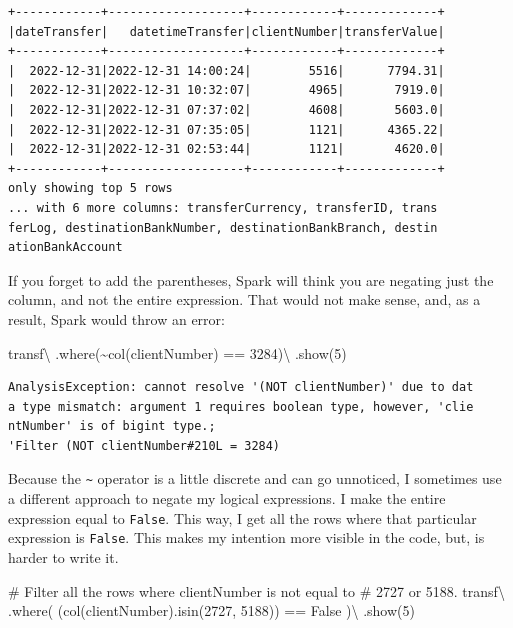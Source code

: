 \documentclass[
  11pt,
  letterpaper,
  DIV=11,
  numbers=noendperiod]{scrreprt}
\newenvironment{Shaded}{\begin{snugshade}}{\end{snugshade}}
\newcommand{\CommentTok}[1]{\textcolor[rgb]{0.37,0.37,0.37}{#1}}
\newcommand{\DecValTok}[1]{\textcolor[rgb]{0.68,0.00,0.00}{#1}}
\newcommand{\NormalTok}[1]{\textcolor[rgb]{0.00,0.23,0.31}{#1}}
\newcommand{\OperatorTok}[1]{\textcolor[rgb]{0.37,0.37,0.37}{#1}}
\newcommand{\StringTok}[1]{\textcolor[rgb]{0.13,0.47,0.30}{#1}}
\newcommand{\VariableTok}[1]{\textcolor[rgb]{0.07,0.07,0.07}{#1}}
\begin{document}
\begin{verbatim}
+------------+-------------------+------------+-------------+
|dateTransfer|   datetimeTransfer|clientNumber|transferValue|
+------------+-------------------+------------+-------------+
|  2022-12-31|2022-12-31 14:00:24|        5516|      7794.31|
|  2022-12-31|2022-12-31 10:32:07|        4965|       7919.0|
|  2022-12-31|2022-12-31 07:37:02|        4608|       5603.0|
|  2022-12-31|2022-12-31 07:35:05|        1121|      4365.22|
|  2022-12-31|2022-12-31 02:53:44|        1121|       4620.0|
+------------+-------------------+------------+-------------+
only showing top 5 rows
... with 6 more columns: transferCurrency, transferID, trans
ferLog, destinationBankNumber, destinationBankBranch, destin
ationBankAccount
\end{verbatim}

If you forget to add the parentheses, Spark will think you are negating
just the column, and not the entire expression. That would not make
sense, and, as a result, Spark would throw an error:

\begin{Shaded}
\begin{Highlighting}[]
\NormalTok{transf}\OperatorTok{\textbackslash{}}
\NormalTok{  .where(}\OperatorTok{\textasciitilde{}}\NormalTok{col(}\StringTok{\textquotesingle{}clientNumber\textquotesingle{}}\NormalTok{) }\OperatorTok{==} \DecValTok{3284}\NormalTok{)}\OperatorTok{\textbackslash{}}
\NormalTok{  .show(}\DecValTok{5}\NormalTok{)}
\end{Highlighting}
\end{Shaded}

\begin{verbatim}
AnalysisException: cannot resolve '(NOT clientNumber)' due to dat
a type mismatch: argument 1 requires boolean type, however, 'clie
ntNumber' is of bigint type.;
'Filter (NOT clientNumber#210L = 3284)
\end{verbatim}

Because the \texttt{\textasciitilde{}} operator is a little discrete and
can go unnoticed, I sometimes use a different approach to negate my
logical expressions. I make the entire expression equal to
\texttt{False}. This way, I get all the rows where that particular
expression is \texttt{False}. This makes my intention more visible in
the code, but, is harder to write it.

\begin{Shaded}
\begin{Highlighting}[]
\CommentTok{\# Filter all the rows where \textasciigrave{}clientNumber\textasciigrave{} is not equal to}
\CommentTok{\# 2727 or 5188.}
\NormalTok{transf}\OperatorTok{\textbackslash{}}
\NormalTok{  .where( (col(}\StringTok{\textquotesingle{}clientNumber\textquotesingle{}}\NormalTok{).isin(}\DecValTok{2727}\NormalTok{, }\DecValTok{5188}\NormalTok{)) }\OperatorTok{==} \VariableTok{False}\NormalTok{ )}\OperatorTok{\textbackslash{}}
\NormalTok{  .show(}\DecValTok{5}\NormalTok{)}
\end{Highlighting}
\end{Shaded}
\end{document}
